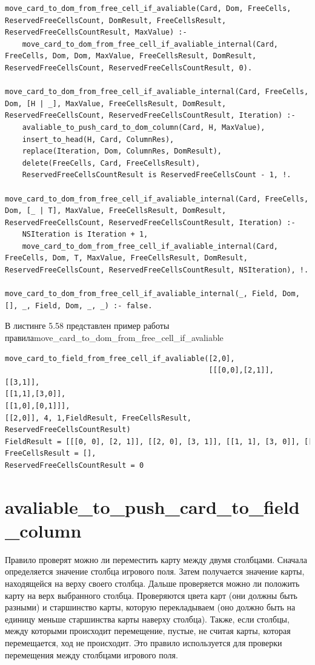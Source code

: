 \documentclass[12pt]{report}
\begin{document}
\begin{lstlisting}[label=some-code, caption=реализация правила move\_card\_to\_dom\_from\_free\_cell\_if\_avaliable] move_card_to_dom_from_free_cell_if_avaliable(Card, Dom, FreeCells, ReservedFreeCellsCount, DomResult, FreeCellsResult, ReservedFreeCellsCountResult, MaxValue) :-
	move_card_to_dom_from_free_cell_if_avaliable_internal(Card, FreeCells, Dom, Dom, MaxValue, FreeCellsResult, DomResult, ReservedFreeCellsCount, ReservedFreeCellsCountResult, 0).

move_card_to_dom_from_free_cell_if_avaliable_internal(Card, FreeCells, Dom, [H | _], MaxValue, FreeCellsResult, DomResult, ReservedFreeCellsCount, ReservedFreeCellsCountResult, Iteration) :-
	avaliable_to_push_card_to_dom_column(Card, H, MaxValue),
	insert_to_head(H, Card, ColumnRes),
	replace(Iteration, Dom, ColumnRes, DomResult),
	delete(FreeCells, Card, FreeCellsResult),
	ReservedFreeCellsCountResult is ReservedFreeCellsCount - 1, !.

move_card_to_dom_from_free_cell_if_avaliable_internal(Card, FreeCells, Dom, [_ | T], MaxValue, FreeCellsResult, DomResult, ReservedFreeCellsCount, ReservedFreeCellsCountResult, Iteration) :-
	NSIteration is Iteration + 1,
	move_card_to_dom_from_free_cell_if_avaliable_internal(Card, FreeCells, Dom, T, MaxValue, FreeCellsResult, DomResult, ReservedFreeCellsCount, ReservedFreeCellsCountResult, NSIteration), !.

move_card_to_dom_from_free_cell_if_avaliable_internal(_, Field, Dom, [], _, Field, Dom, _, _) :- false.
\end{lstlisting}
В листинге 5.58 представлен пример работы правила\newline move\_card\_to\_dom\_from\_free\_cell\_if\_avaliable

\begin{lstlisting}[label=some-code, caption=пример работы правила \newline move\_card\_to\_dom\_from\_free\_cell\_if\_avaliable] 
move_card_to_field_from_free_cell_if_avaliable([2,0],
                                               [[[0,0],[2,1]],
[[3,1]],
[[1,1],[3,0]],
[[1,0],[0,1]]],
[[2,0]], 4, 1,FieldResult, FreeCellsResult, ReservedFreeCellsCountResult)
FieldResult = [[[0, 0], [2, 1]], [[2, 0], [3, 1]], [[1, 1], [3, 0]], [[1, 0], [0, 1]]], 
FreeCellsResult = [], 
ReservedFreeCellsCountResult = 0
\end{lstlisting}

\section{avaliable\_to\_push\_card\_to\_field\_column}
Правило проверят можно ли переместить карту между двумя столбцами. Сначала определяется значение столбца игрового поля. Затем получается значение карты, находящейся на верху своего столбца. Дальше проверяется можно ли положить карту на верх выбранного столбца. Проверяются цвета карт (они должны быть разными) и старшинство карты, которую перекладываем (оно должно быть на единицу меньше старшинства карты наверху столбца). Также, если столбцы, между которыми происходит перемещение, пустые, не считая карты, которая перемещается, ход не происходит. Это правило используется для проверки перемещения между столбцами игрового поля.
\end{document}
